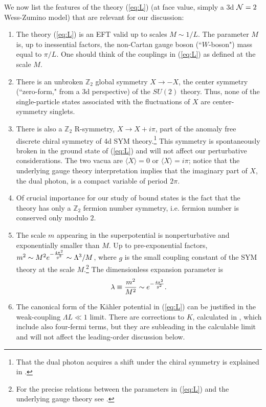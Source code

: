 \documentclass[11pt]{article}
\def\Z{{\mathbb Z}}
\begin{document}
 We now list the features of the theory (\ref{eq:L}) (at face value, simply a 3d ${\cal N}=2$ Wess-Zumino model) that are relevant for our discussion: 
 \begin{enumerate}
 \item The theory (\ref{eq:L}) is an EFT valid up to scales $M \sim 1/L$. The parameter $M$ is, up to inessential factors, the non-Cartan gauge boson (``$W$-boson") mass equal to $ \pi/L$. One should think of the couplings in (\ref{eq:L}) as defined at the scale $M$.
 \item There is an unbroken $\Z_2$ global symmetry $X \rightarrow - X$,  the center symmetry (``zero-form," from a 3d perspective)  of the $SU(2)$ theory. Thus, none of the single-particle states associated with the fluctuations of $X$ are center-symmetry singlets.  
\item There is also a $\Z_2$ R-symmetry, $X \rightarrow X + i \pi$, part of the anomaly free discrete chiral symmetry of  4d SYM theory.\footnote{That the dual photon acquires a shift under the chiral symmetry is explained in \cite{Aharony:1997bx}.} This symmetry is spontaneously broken in the ground state of (\ref{eq:L}) and will not affect our perturbative considerations. The two vacua are $\langle X \rangle = 0$ or $\langle X \rangle = i \pi$; notice that the underlying gauge theory interpretation implies that the imaginary part of $X$, the dual photon, is a compact variable of period $2 \pi$. 
\item  Of crucial importance for our study of bound states is the fact that the theory has only a $\Z_2$ fermion number symmetry, i.e. fermion number is conserved only modulo $2$.
   \item The scale $m$ appearing in the superpotential is nonperturbative and exponentially smaller than $M$. Up to pre-exponential factors, $m^2 \sim M^2 e^{- {4 \pi^2 \over g^2}} \sim {\Lambda^3/M}$, where $g$ is the  small  coupling constant of the SYM theory at the scale $M$.\footnote{For the precise relations between the parameters in (\ref{eq:L}) and the underlying gauge theory see \cite{Poppitz:2012sw,Anber:2014lba}. }  The  dimensionless expansion parameter is  
\begin{equation}\label{eq:epsilon}
\lambda \equiv {m^2 \over M^2} \sim e^{- {4 \pi^2 \over g^2}}. 
\end{equation}\item The canonical form of the K\" ahler potential in (\ref{eq:L})   can be justified in the weak-coupling $\Lambda L\ll 1$ limit. There are corrections to $K$, calculated in \cite{Anber:2014lba,Anber:2014sda}, which include also four-fermi terms, but they are subleading in the calculable limit and will not affect the leading-order discussion below.
\end{enumerate}
\end{document}
